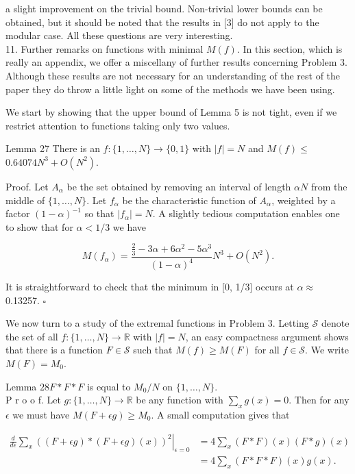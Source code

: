 \documentclass[10pt]{article}
\begin{document}
a slight improvement on the trivial bound. Non-trivial lower bounds can be obtained, but it should be noted that the results in [3] do not apply to the modular case. All these questions are very interesting.\\
11. Further remarks on functions with minimal $M(f)$. In this section, which is really an appendix, we offer a miscellany of further results concerning Problem 3. Although these results are not necessary for an understanding of the rest of the paper they do throw a little light on some of the methods we have been using.

We start by showing that the upper bound of Lemma 5 is not tight, even if we restrict attention to functions taking only two values.

Lemma 27 There is an $f:\{1, \ldots, N\} \rightarrow\{0,1\}$ with $|f|=N$ and $M(f) \leq$ $0.64074 N^{3}+O\left(N^{2}\right)$.

Proof. Let $A_{\alpha}$ be the set obtained by removing an interval of length $\alpha N$ from the middle of $\{1, \ldots, N\}$. Let $f_{\alpha}$ be the characteristic function of $A_{\alpha}$, weighted by a factor $(1-\alpha)^{-1}$ so that $\left|f_{\alpha}\right|=N$. A slightly tedious computation enables one to show that for $\alpha<1 / 3$ we have

$$
M\left(f_{\alpha}\right)=\frac{\frac{2}{3}-3 \alpha+6 \alpha^{2}-5 \alpha^{3}}{(1-\alpha)^{4}} N^{3}+O\left(N^{2}\right) .
$$

It is straightforward to check that the minimum in [0, 1/3] occurs at $\alpha \approx$ 0.13257. \(\square\)

We now turn to a study of the extremal functions in Problem 3. Letting $\mathcal{S}$ denote the set of all $f:\{1, \ldots, N\} \rightarrow \mathbb{R}$ with $|f|=N$, an easy compactness argument shows that there is a function $F \in \mathcal{S}$ such that $M(f) \geq M(F)$ for all $f \in \mathcal{S}$. We write $M(F)=M_{0}$.

Lemma $28 F * F * F$ is equal to $M_{0} / N$ on $\{1, \ldots, N\}$.\\
P r o o f. Let $g:\{1, \ldots, N\} \rightarrow \mathbb{R}$ be any function with $\sum_{x} g(x)=0$. Then for any $\epsilon$ we must have $M(F+\epsilon g) \geq M_{0}$. A small computation gives that

$$
\begin{aligned}
\left.\frac{d}{d \epsilon} \sum_{x}((F+\epsilon g) *(F+\epsilon g)(x))^{2}\right|_{\epsilon=0} & =4 \sum_{x}(F * F)(x)(F * g)(x) \\
& =4 \sum_{x}(F * F * F)(x) g(x) .
\end{aligned}
$$
\end{document}
